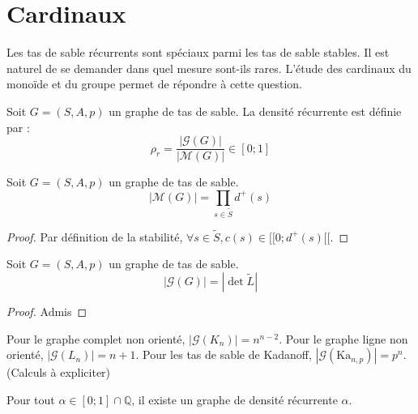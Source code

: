 
\section{Cardinaux}

Les tas de sable récurrents sont spéciaux parmi les tas de sable stables. Il est
naturel de se demander dans quel mesure sont-ils rares. L'étude des cardinaux du
monoïde et du groupe permet de répondre à cette question.

\begin{definition}
Soit $G = (S, A, p)$ un graphe de tas de sable.
La densité récurrente est définie par :
$$
\rho_r = \frac{
    \left| \mathcal{G}\left(G\right) \right|
}{
    \left| \mathcal{M}\left(G\right) \right|
}
\in [0;1]
$$
\end{definition}

\begin{proposition}
Soit $G = (S, A, p)$ un graphe de tas de sable.
$$
\left| \mathcal{M}\left(G\right) \right| = \prod_{s \in \widetilde{S}} d^+(s)
$$
\end{proposition}

\begin{proof}
Par définition de la stabilité, $\forall s \in \widetilde{S},
c(s) \in [\![0;d^+(s)[\![$.
\end{proof}

\begin{proposition}
Soit $G = (S, A, p)$ un graphe de tas de sable.
$$
\left| \mathcal{G}\left(G\right) \right| = \left| \det \widetilde{L} \right|
$$
\end{proposition}

\begin{proof}
Admis
\end{proof}

\begin{remarque}
Pour le graphe complet non orienté,
$\left|\mathcal{G}\left(K_n\right)\right| = n^{n-2}$.
Pour le graphe ligne non orienté,
$\left|\mathcal{G}\left(L_n\right)\right| = n+1$.
Pour les tas de sable de Kadanoff,
$\left|\mathcal{G}\left(\text{Ka}_{n, p}\right)\right| = p^n$.
(Calculs à expliciter)
\end{remarque}

\begin{proposition}
Pour tout $\alpha \in [0; 1] \cap \mathbb{Q}$, il existe un graphe de densité
récurrente $\alpha$.
\end{proposition}

